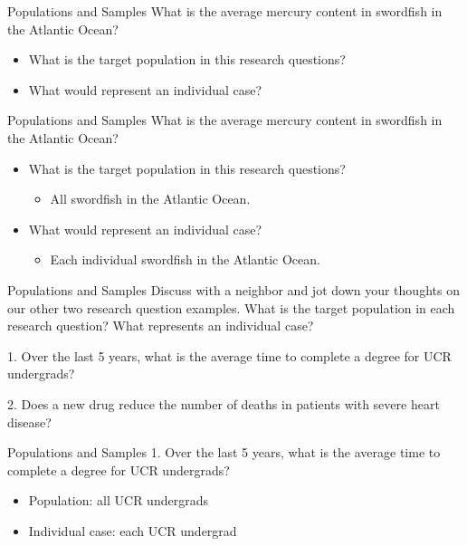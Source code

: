 \begin{frame}{Populations and Samples}
    What is the average mercury content in swordfish in the Atlantic Ocean?
    
    \begin{itemize}
        \item What is the target population in this research questions?
        \item What would represent an individual case?
    \end{itemize}
\end{frame}

\begin{frame}{Populations and Samples}
    What is the average mercury content in swordfish in the Atlantic Ocean?
    
    \begin{itemize}
        \item What is the target population in this research questions?
        \begin{itemize}
            \item All swordfish in the Atlantic Ocean.
        \end{itemize}
        \item What would represent an individual case?
        \begin{itemize}
            \item Each individual swordfish in the Atlantic Ocean.
        \end{itemize}
    \end{itemize}
\end{frame}

\begin{frame}{Populations and Samples}
    Discuss with a neighbor and jot down your thoughts on our other two research question examples. What is the target population in each research question? What represents an individual case?
    
    \vspace{12pt}
    1. Over the last 5 years, what is the average time to complete a degree for UCR undergrads?
    
    2. Does a new drug reduce the number of deaths in patients with severe heart disease?
    
\end{frame}

\begin{frame}{Populations and Samples}
    1. Over the last 5 years, what is the average time to complete a degree for UCR undergrads?
    \begin{itemize}
        \item Population: all UCR undergrads
        \item Individual case: each UCR undergrad
    \end{itemize}
\end{frame}

